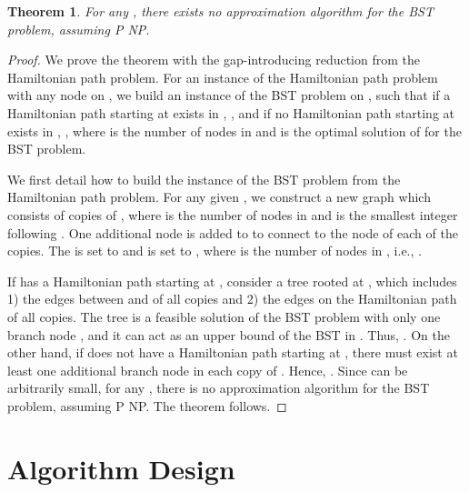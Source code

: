 \documentclass[conference]{IEEEtran}
\newtheorem{theorem}{Theorem}
\begin{document}
\begin{theorem}
\label{hardness} For any , there exists no 
approximation algorithm for the BST problem, assuming P  NP.
\end{theorem}

\begin{proof}
We prove the theorem with the gap-introducing reduction from the Hamiltonian
path problem. For an instance  of the Hamiltonian path
problem with any node  on , we build an instance of the BST
problem on , such that \newline
 if a Hamiltonian path starting at  exists in , , and\newline
 if no Hamiltonian path starting at  exists in ,  \newline
, where  is the number of nodes in  and  is the
optimal solution of  for the BST problem.

We first detail how to build the instance of the BST problem from the
Hamiltonian path problem. For any given , we construct a new graph 
which consists of  copies of , where  is the number of
nodes in  and  is the smallest integer following . One additional node  is added to  to connect to the node  of each of the  copies.
The  is set to  and  is set to , where  is the number
of nodes in , i.e., .


If  has a Hamiltonian path starting at , consider a tree rooted at , which
includes 1) the edges between  and  of all copies and 2) the edges on
the Hamiltonian path of all copies. The tree is a feasible solution of the
BST problem with only one branch node , and it can act as an upper bound
of the BST in .
Thus, . On the other hand, if  does
not have a Hamiltonian path starting at , there must exist at least one
additional branch node in each copy of . Hence, . Since  can be
arbitrarily small, for any , there is no 
approximation algorithm for the BST problem, assuming P  NP. The theorem
follows.
\end{proof}

\section{Algorithm Design}
\end{document}
